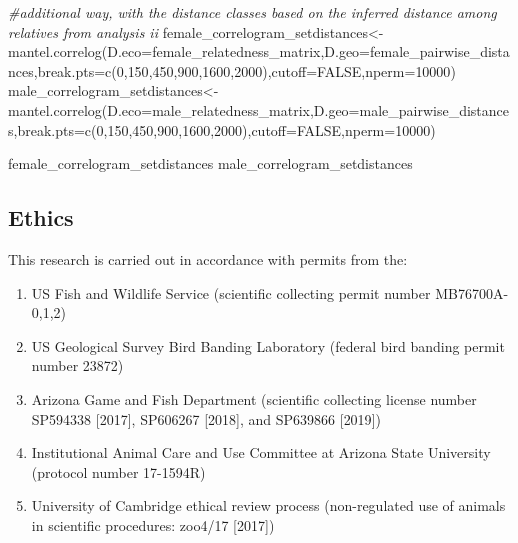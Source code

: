 \documentclass[
]{article}
\newenvironment{Shaded}{\begin{snugshade}}{\end{snugshade}}
\newcommand{\AttributeTok}[1]{\textcolor[rgb]{0.77,0.63,0.00}{#1}}
\newcommand{\CommentTok}[1]{\textcolor[rgb]{0.56,0.35,0.01}{\textit{#1}}}
\newcommand{\ConstantTok}[1]{\textcolor[rgb]{0.00,0.00,0.00}{#1}}
\newcommand{\DecValTok}[1]{\textcolor[rgb]{0.00,0.00,0.81}{#1}}
\newcommand{\FunctionTok}[1]{\textcolor[rgb]{0.00,0.00,0.00}{#1}}
\newcommand{\NormalTok}[1]{#1}
\newcommand{\OtherTok}[1]{\textcolor[rgb]{0.56,0.35,0.01}{#1}}
\providecommand{\tightlist}{%
  \setlength{\itemsep}{0pt}\setlength{\parskip}{0pt}}
\begin{document}
\begin{Shaded}
\begin{Highlighting}[]
\CommentTok{\#additional way, with the distance classes based on the inferred distance among relatives from analysis ii}
\NormalTok{female\_correlogram\_setdistances}\OtherTok{\textless{}{-}}\FunctionTok{mantel.correlog}\NormalTok{(}\AttributeTok{D.eco=}\NormalTok{female\_relatedness\_matrix,}\AttributeTok{D.geo=}\NormalTok{female\_pairwise\_distances,}\AttributeTok{break.pts=}\FunctionTok{c}\NormalTok{(}\DecValTok{0}\NormalTok{,}\DecValTok{150}\NormalTok{,}\DecValTok{450}\NormalTok{,}\DecValTok{900}\NormalTok{,}\DecValTok{1600}\NormalTok{,}\DecValTok{2000}\NormalTok{),}\AttributeTok{cutoff=}\ConstantTok{FALSE}\NormalTok{,}\AttributeTok{nperm=}\DecValTok{10000}\NormalTok{)}
\NormalTok{male\_correlogram\_setdistances}\OtherTok{\textless{}{-}}\FunctionTok{mantel.correlog}\NormalTok{(}\AttributeTok{D.eco=}\NormalTok{male\_relatedness\_matrix,}\AttributeTok{D.geo=}\NormalTok{male\_pairwise\_distances,}\AttributeTok{break.pts=}\FunctionTok{c}\NormalTok{(}\DecValTok{0}\NormalTok{,}\DecValTok{150}\NormalTok{,}\DecValTok{450}\NormalTok{,}\DecValTok{900}\NormalTok{,}\DecValTok{1600}\NormalTok{,}\DecValTok{2000}\NormalTok{),}\AttributeTok{cutoff=}\ConstantTok{FALSE}\NormalTok{,}\AttributeTok{nperm=}\DecValTok{10000}\NormalTok{)}

\NormalTok{female\_correlogram\_setdistances}
\NormalTok{male\_correlogram\_setdistances}
\end{Highlighting}
\end{Shaded}

\newpage

\hypertarget{ethics}{%
\subsection{Ethics}\label{ethics}}

This research is carried out in accordance with permits from the:

\begin{enumerate}
\def\labelenumi{\arabic{enumi})}
\tightlist
\item
  US Fish and Wildlife Service (scientific collecting permit number
  MB76700A-0,1,2)
\item
  US Geological Survey Bird Banding Laboratory (federal bird banding
  permit number 23872)
\item
  Arizona Game and Fish Department (scientific collecting license number
  SP594338 {[}2017{]}, SP606267 {[}2018{]}, and SP639866 {[}2019{]})
\item
  Institutional Animal Care and Use Committee at Arizona State
  University (protocol number 17-1594R)
\item
  University of Cambridge ethical review process (non-regulated use of
  animals in scientific procedures: zoo4/17 {[}2017{]})
\end{enumerate}
\end{document}
